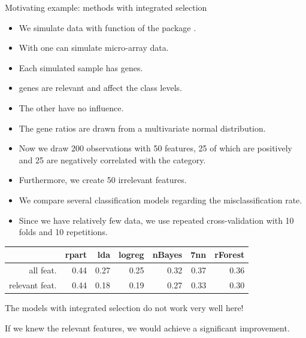 \begin{vbframe}{Motivating example: methods with integrated selection}

\begin{itemize}
\item We simulate data with function  of the package .
\item With  one can simulate micro-array data.
\item Each simulated sample has  genes.
\item {} genes are relevant and affect the class levels.
\item The other  have no influence.
\item The gene ratios are drawn from a multivariate normal distribution.
\end{itemize}

\framebreak

\begin{itemize}
\item Now we draw 200 observations with 50 features, 25 of which are positively and 25 are negatively correlated with the category.
\item Furthermore, we create 50 irrelevant features.
\item We compare several classification models regarding the misclassification rate.
\item Since we have relatively few data, we use repeated cross-validation with 10 folds and 10 repetitions.
\end{itemize}

\begin{table}[ht]
  \begin{center}
    \begin{tabular}{rrrrrrr}
      \hline
      & rpart & lda & logreg & nBayes & 7nn  & rForest \\
      \hline
      all feat. & 0.44 & 0.27 & 0.25 & 0.32 & 0.37 & 0.36 \\
      relevant feat. & 0.44 & 0.18 & 0.19 & 0.27 & 0.33 & 0.30 \\
      \hline
    \end{tabular}
  \end{center}
\end{table}

The models with integrated selection do not work very well here!

If we knew the relevant features, we would achieve a significant improvement.
\end{vbframe}




